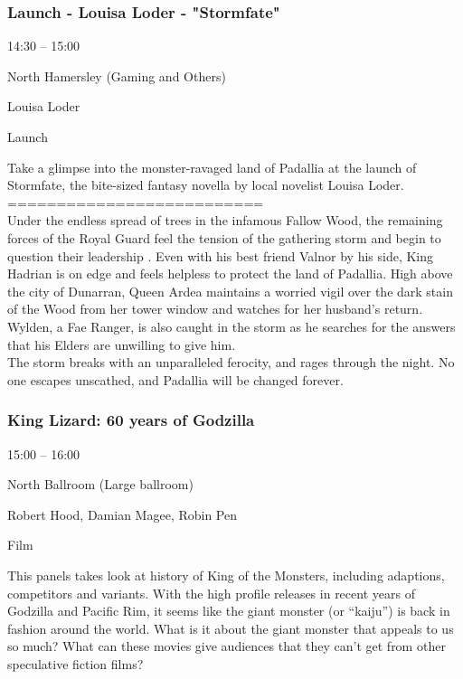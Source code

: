 \documentclass{scrreprt}
\begin{document}
\begin{multicols}{2}
\subsubsection*{Launch - Louisa Loder - "Stormfate"}\begin{description}
\setlength{\itemsep}{0pt}
\setlength{\parsep}{0pt}
\setlength{\parskip}{0pt}
\item[Time:]{14:30 -- 15:00}
\item[Venue:]{North Hamersley (Gaming and Others)}
\item[People:]{Louisa Loder}
\item[Tags:]{Launch}\end{description}
Take a glimpse into the monster-ravaged land of Padallia at the launch of Stormfate, the bite-sized fantasy novella by local novelist Louisa Loder.\\==========================\\Under the endless spread of trees in the infamous Fallow Wood, the remaining forces of the Royal Guard feel the tension of the gathering storm and begin to question their leadership . Even with his best friend Valnor by his side, King Hadrian is on edge and feels helpless to protect the land of Padallia. High above the city of Dunarran, Queen Ardea maintains a worried vigil over the dark stain of the Wood from her tower window and watches for her husband's return. Wylden, a Fae Ranger, is also caught in the storm as he searches for the answers that his Elders are unwilling to give him.\\The storm breaks with an unparalleled ferocity, and rages through the night. No one escapes unscathed, and Padallia will be changed forever.
\subsubsection*{King Lizard: 60 years of Godzilla}\begin{description}
\setlength{\itemsep}{0pt}
\setlength{\parsep}{0pt}
\setlength{\parskip}{0pt}
\item[Time:]{15:00 -- 16:00}
\item[Venue:]{North Ballroom (Large ballroom)}
\item[People:]{Robert Hood, Damian Magee, Robin Pen}
\item[Tags:]{Film}\end{description}
This panels takes look at history of King of the Monsters, including adaptions, competitors and variants. With the high profile releases in recent years of Godzilla and Pacific Rim, it seems like the giant monster (or “kaiju”) is back in fashion around the world. What is it about the giant monster that appeals to us so much? What can these movies give audiences that they can’t get from other speculative fiction films?

\end{multicols}
\end{document}
